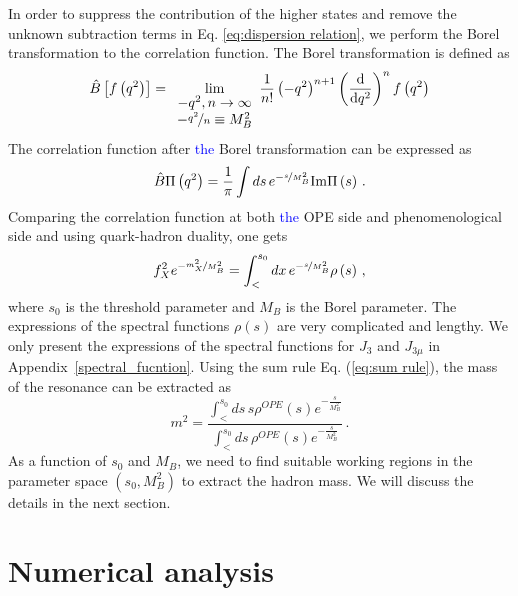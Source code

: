 \documentclass[prd,showpacs,showkeys,floatfix,amsmath,amssymb,floatfix,english]{revtex4}
\newcommand{\chadd}[1]{\textcolor{blue}{#1}}
\begin{document}
In order to suppress the contribution of the higher states and
remove the unknown subtraction terms in Eq. \eqref{eq:dispersion
relation}, we perform the Borel transformation to the correlation
function. The Borel transformation is defined as
\begin{equation}
\hat{B}\left[f\left(q^{2}\right)\right]=\underset{\begin{array}{c}
-q^{2},n\rightarrow\infty\\
-\nicefrac{q^{2}}{n}\equiv M_{B}^{2}
\end{array}}{\lim}\frac{1}{n!}\left(-q^{2}\right)^{n+1}\left(\frac{\mathrm{d}}{\mathrm{d}q^{2}}\right)^{n}f\left(q^{2}\right)
\end{equation}
The correlation function after \chadd{the} Borel transformation can
be expressed as
\begin{equation}
\hat{B}\Pi\left(q^{2}\right)=\frac{1}{\pi}\int
ds\,e^{-\nicefrac{s}{M_{B}^{2}}}\mathrm{Im}\Pi\left(s\right)\, .
\end{equation}
Comparing the correlation function at both \chadd{the} OPE side and
phenomenological side and using quark-hadron duality, one gets
\begin{equation}
f_{X}^{2}e^{-\nicefrac{m_{X}^{2}}{M_{B}^{2}}}=\int_{<}^{s_{0}}dx\,e^{-\nicefrac{s}{M_{B}^{2}}}\rho\left(s\right)\,
, \label{eq:sum rule}
\end{equation}
where $s_{0}$ is the threshold parameter and $M_{B}$ is the Borel
parameter. The expressions of the spectral functions
$\rho\left(s\right)$ are very complicated and lengthy. We only
present the expressions of the spectral functions for $J_3$ and
$J_{3\mu}$ in Appendix~\ref{spectral_fucntion}. Using the sum rule
Eq. (\ref{eq:sum rule}), the mass of the resonance can be extracted
as
\begin{equation}
m^{2}=\frac{\int_{<}^{s_{0}}ds\,s\rho^{OPE}\left(s\right)e^{-\frac{s}{M_{B}^{2}}}}{\int_{<}^{s_{0}}ds\,\rho^{OPE}\left(s\right)e^{-\frac{s}{M_{B}^{2}}}}\,
.
\end{equation}
As a function of $s_{0}$ and $M_{B}$, we need to find suitable
working regions in the parameter space
$\left(s_{0},M_{B}^{2}\right)$ to extract the hadron mass. We will
discuss the details in the next section.

\section{Numerical analysis}
\label{sec3}
\end{document}
